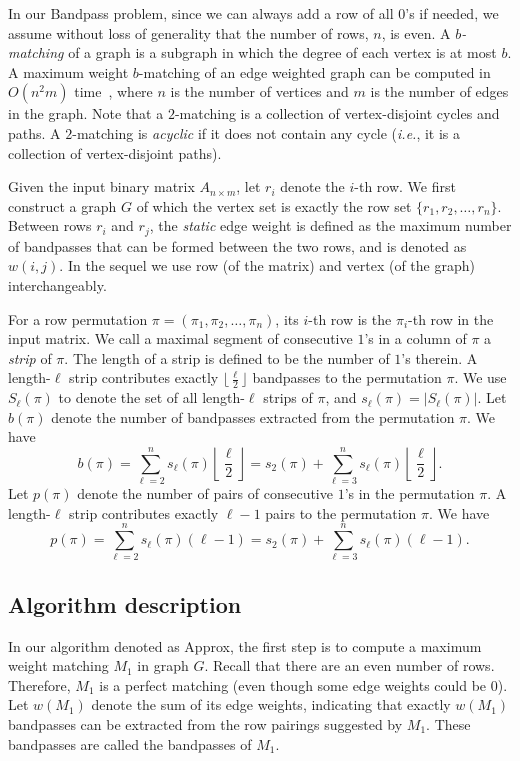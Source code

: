 \documentclass[11pt,twoside]{article}\usepackage{amssymb,latexsym,graphicx,hyperref}\usepackage{epstopdf}
\begin{document}
In our Bandpass problem, since we can always add a row of all $0$'s if needed,
we assume without loss of generality that the number of rows, $n$, is even.
A {\em $b$-matching} of a graph is a subgraph in which the degree of each vertex is at most $b$.
A maximum weight $b$-matching of an edge weighted graph can be computed in $O(n^2m)$ time~\cite{Gab83,Ans87,MP95},
where $n$ is the number of vertices and $m$ is the number of edges in the graph.
Note that a $2$-matching is a collection of vertex-disjoint cycles and paths.
A $2$-matching is {\em acyclic} if it does not contain any cycle ({\it i.e.}, it is a collection of vertex-disjoint paths).


Given the input binary matrix $A_{n \times m}$, let $r_i$ denote the $i$-th row.
We first construct a graph $G$ of which the vertex set is exactly the row set $\{r_1, r_2, \ldots, r_n\}$.
Between rows $r_i$ and $r_j$, the {\em static} edge weight is defined as the maximum number of bandpasses that can be formed between the two rows,
and is denoted as $w(i, j)$.
In the sequel we use row (of the matrix) and vertex (of the graph) interchangeably.


For a row permutation $\pi = (\pi_1, \pi_2, \ldots, \pi_n)$, its $i$-th row is the $\pi_i$-th row in the input matrix.
We call a maximal segment of consecutive $1$'s in a column of $\pi$ a {\em strip} of $\pi$.
The length of a strip is defined to be the number of $1$'s therein.
A length-$\ell$ strip contributes exactly $\lfloor \frac {\ell}2 \rfloor$ bandpasses to the permutation $\pi$.
We use $S_\ell(\pi)$ to denote the set of all length-$\ell$ strips of $\pi$, and $s_\ell(\pi) = |S_\ell(\pi)|$.
Let $b(\pi)$ denote the number of bandpasses extracted from the permutation $\pi$.
We have
\begin{equation}
\label{eq1}
b(\pi) = \sum_{\ell = 2}^n s_\ell(\pi) \left\lfloor \frac {\ell}2 \right\rfloor
= s_2(\pi) + \sum_{\ell = 3}^n s_\ell(\pi) \left\lfloor \frac {\ell}2 \right\rfloor.
\end{equation}
Let $p(\pi)$ denote the number of pairs of consecutive $1$'s in the permutation $\pi$.
A length-$\ell$ strip contributes exactly $\ell - 1$ pairs to the permutation $\pi$.
We have
\begin{equation}
\label{eq2}
p(\pi) = \sum_{\ell = 2}^n s_\ell(\pi) (\ell - 1) = s_2(\pi) + \sum_{\ell = 3}^n s_\ell(\pi) (\ell - 1).
\end{equation}


\subsection{Algorithm description}
In our algorithm denoted as {\sc Approx}, the first step is to compute a maximum weight matching $M_1$ in graph $G$.
Recall that there are an even number of rows.
Therefore, $M_1$ is a perfect matching (even though some edge weights could be $0$).
Let $w(M_1)$ denote the sum of its edge weights, indicating that exactly $w(M_1)$ bandpasses can be extracted from the row pairings suggested by $M_1$.
These bandpasses are called the bandpasses of $M_1$.
\end{document}
